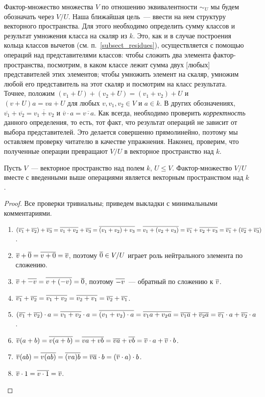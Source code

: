 Фактор-множество множества $V$ по отношению эквивалентности $\sim_U$
мы будем обозначать через $V/U$. Наша ближайшая цель~--- ввести на нем
структуру векторного пространства.
Для этого необходимо определить сумму классов и результат умножения
класса на скаляр из $k$. Это, как и в случае построения кольца
классов вычетов (см. п.~\ref{subsect_residues}), осуществляется с
помощью операций над представителями классов: чтобы сложить два
элемента фактор-пространства, посмотрим, в каком классе лежит сумма
двух [любых] представителей этих элементов; чтобы умножить элемент на
скаляр, умножим любой его представитель на этот скаляр и посмотрим на
класс результата.
Точнее, положим $(v_1+U)+(v_2+U)=(v_1+v_2)+U$ и
$(v+U)a=va+U$ для любых $v,v_1,v_2\in V$ и $a\in k$.
В других обозначениях,
$\overline{v_1}+\overline{v_2} = \overline{v_1+v_2}$ и
$\overline{v}\cdot a = \overline{v\cdot a}$.
Как всегда, необходимо проверить {\em корректность} данного
определения, то есть, тот факт, что результат операций не зависит от
выбора представителей. Это делается совершенно прямолинейно, поэтому
мы оставляем проверку читателю в качестве упражнения.
Наконец, проверим, что полученные операции превращают $V/U$ в
векторное пространство над $k$.
\begin{proposition}\label{prop:quotient_space}
Пусть $V$~--- векторное пространство над полем $k$, $U\leq
V$. Фактор-множество $V/U$ вместе с введенными выше операциями
является векторным пространством над $k$.
\end{proposition}
\begin{proof}
Все проверки тривиальны; приведем выкладки с минимальными
комментариями.
\begin{enumerate}
\item $(\overline{v_1}+\overline{v_2})+\overline{v_3} = \overline{v_1+v_2}+\overline{v_3} =
\overline{(v_1+v_2)+v_3} = \overline{v_1+(v_2+v_3)} = \overline{v_1}+\overline{v_2+v_3} =
\overline{v_1}+(\overline{v_2}+\overline{v_3})$.
\item $\overline{v}+\overline{0}=\overline{v+0}=\overline{v}$, поэтому $\overline{0}\in V/U$ играет
  роль нейтрального элемента по сложению.
\item $\overline{v}+\overline{-v}=\overline{v+(-v)}=\overline{0}$, поэтому $\overline{-v}$~---
  обратный по сложению к $\overline{v}$.
\item $\overline{v_1}+\overline{v_2}=\overline{v_1+v_2}=\overline{v_2+v_1}=\overline{v_2}+\overline{v_1}$.
\item $(\overline{v_1}+\overline{v_2})\cdot a = \overline{v_1+v_2}\cdot a = 
\overline{(v_1+v_2)\cdot a} = \overline{v_1 a+v_2 a} =
\overline{v_1 a} + \overline{v_2 a} = \overline{v_1}\cdot a +
\overline{v_2}\cdot a$.
\item $\overline{v}(a+b) = \overline{v(a+b)} = \overline{va+vb}
  = \overline{va} + \overline{vb} = \overline{v}\cdot a + \overline{v}\cdot b$.
\item $\overline{v}(ab) = \overline{v(ab)} = \overline{(va)b} =
  \overline{va}\cdot b = (\overline{v}\cdot a)\cdot b$.
\item $\overline{v}\cdot 1 = \overline{v\cdot 1} = \overline{v}$.
\end{enumerate}
\end{proof}

